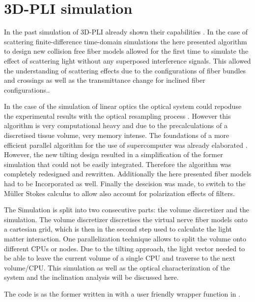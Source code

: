 \setcounter{chapter}{4}
\chapter{\acs{3D-PLI} simulation}
\label{cha:sof:simulation}
%
In the past simulation of \ac{3D-PLI} already shown their capabilities \cite{Dohmen2015,Menzel2015,Menzel2016,Menzel2020,Menzel2021,MenzelMaster,MenzelDissertation}.
In the case of scattering finite-difference time-domain simulations the here presented algorithm to design new collision free fiber models allowed for the first time to simulate the effect of scattering light without any superposed interference signals.
This allowed the understanding of scattering effects due to the configurations of fiber bundles and crossings as well as the transmittance change for inclined fiber configurations.\cite{MenzelDissertation,Menzel2020,Menzel2021}.
\par
% 
In the case of the simulation of linear optics the optical system could repoduse the experimental results with \eg{} the optical resampling process \cite{Dohmen2015,Menzel2016}.
However this algorithm is very computational heavy and due to the precalculations of a discretised tissue volume, very memory intense.
The foundations of a more efficient parallel algorithm for the use of supercomputer was already elaborated \cite{Lucksch2016}.
However, the new tilting design resulted in a simplification of the former simulation that could not be easily integrated.
Therefore the algorithm was completely redesigned and rewritten.
Additionally the here presented fiber models had to be Incorporated as well.
Finally the descision was made, to switch to the M\"{u}ller Stokes calculus to allow also account for polarization effects of filters.
\par
%
The Simulation is split into two consecutive parts: the volume discretizer and the simulation.
The volume discretizer discretises the virtual nerve fiber models onto a cartesian grid, which is then in the second step used to calculate the light matter interaction.
One parallelization technique allows to split the volume onto different \acp{CPU} or nodes.
Due to the tilting approach, the light vector needed to be able to leave the current volume of a single \ac{CPU} and traverse to the next volume/\ac{CPU}.
This simulation as well as the optical characterization of the system and the inclination analysis will be discussed here.
\par
%
The code is as the former written in \cpp{} with a user friendly wrapper function in \python{}.
%
% 
% 
